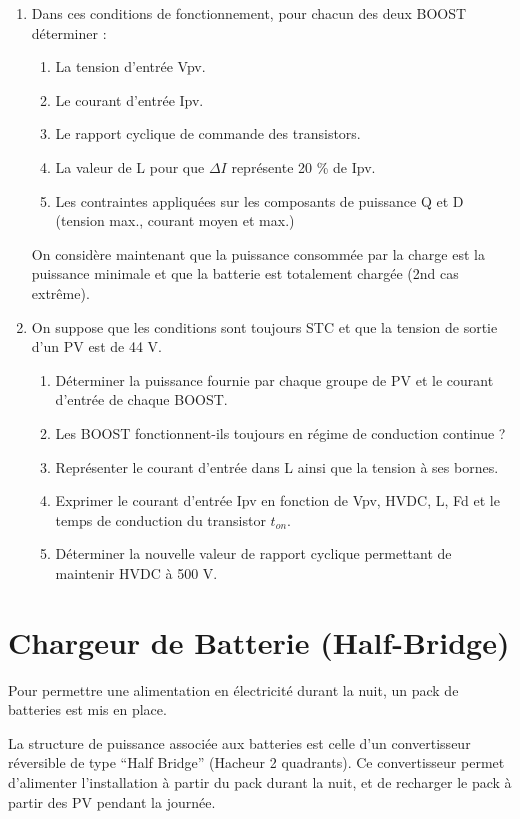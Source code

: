 \begin{enumerate}
\item Dans ces conditions de fonctionnement, pour chacun des deux BOOST déterminer :
\begin{enumerate}
\item La tension d’entrée Vpv.
\item Le courant d’entrée Ipv.
\item Le rapport cyclique de commande des transistors.
\item La valeur de L pour que $\Delta I$ représente 20 \% de Ipv.
\item Les contraintes appliquées sur les composants de puissance Q et D (tension max., courant moyen et max.) 
\end{enumerate}

On considère maintenant que la puissance consommée par la charge est la puissance minimale et que la batterie est totalement chargée (2nd cas extrême).

\item On suppose que les conditions sont toujours STC et que la tension de sortie d’un PV est de 44 V.
\begin{enumerate}
\item Déterminer la puissance fournie par chaque groupe de PV et le courant d’entrée de chaque BOOST.
\item Les BOOST fonctionnent-ils toujours en régime de conduction continue ?
\item Représenter le courant d’entrée dans L ainsi que la tension à ses bornes.
\item Exprimer le courant d’entrée Ipv en fonction de Vpv, HVDC, L, Fd et le temps de conduction du transistor $t_{on}$.
\item Déterminer la nouvelle valeur de rapport cyclique permettant de maintenir HVDC à 500 V.
\end{enumerate}

\end{enumerate}

\newpage
\section{Chargeur de Batterie (Half-Bridge)}

Pour permettre une alimentation en électricité durant la nuit, un pack de batteries est mis en place.

La structure de puissance associée aux batteries est celle d’un convertisseur réversible de type ``Half Bridge'' (Hacheur 2 quadrants). Ce convertisseur permet d’alimenter l’installation à partir du pack durant la nuit, et de recharger le pack à partir des PV pendant la journée.

